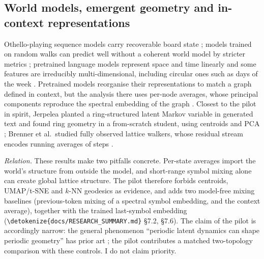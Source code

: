 \documentclass[11pt,a4paper]{article}
\DeclareRobustCommand{\_}{\ifmmode\origunderscore\else\textunderscore\allowbreak\fi}
\DeclareRobustCommand{\fpath}[1]{\begingroup\small\expandafter\nolinkurl\expandafter{\detokenize{#1}}\endgroup}
\begin{document}
\subsection{World models, emergent geometry and in-context representations}
Othello-playing sequence models carry recoverable board state \citep{li2023othello}; models
trained on random walks can predict well without a coherent world model by stricter metrics
\citep{vafa2024worldmodel}; pretrained language models represent space and time linearly
\citep{gurnee2024space} and some features are irreducibly multi-dimensional, including
circular ones such as days of the week \citep{engels2025notlinear}. Pretrained models
reorganise their representations to match a graph defined in context, but the analysis there
uses per-node averages, whose principal components reproduce the spectral embedding of the
graph \citep{park2025iclr}. Closest to the pilot in spirit, Jerpelea planted a ring-structured
latent Markov variable in generated text and found ring geometry in a from-scratch student,
using centroids and PCA \citep{jerpelea2026planting}; Brenner et al.\ studied fully observed
lattice walkers, whose residual stream encodes running averages of steps
\citep{brenner2026grid}.

\emph{Relation.} These results make two pitfalls concrete. Per-state averages import the world's
structure from outside the model, and short-range symbol mixing alone can create global
lattice structure. The pilot therefore forbids centroids, UMAP/t-SNE and $k$-NN geodesics as
evidence, and adds two model-free mixing baselines (previous-token mixing of a spectral
symbol embedding, and the context average), together with the trained last-symbol embedding
(\fpath{docs/RESEARCH_SUMMARY.md} \S7.2, \S7.6). The claim of the pilot is accordingly narrow:
the general phenomenon ``periodic latent dynamics can shape periodic geometry'' has prior art
\citep{jerpelea2026planting}; the pilot contributes a matched two-topology comparison with these
controls. I do not claim priority.
\end{document}
